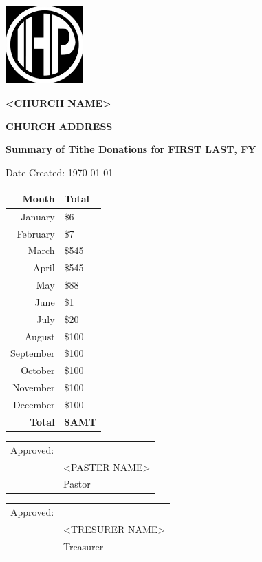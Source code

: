 \documentclass{article}
\newcommand{\mysubtitle}[1]{\large\textbf{#1}\par}
\newcommand{\mytitle}[1]{\LARGE \textbf{#1}\par}
\newcommand{\mydate}[1]{\small #1\par}
\begin{document}
\noindent
\begin{minipage}[t]{.3\textwidth}
\vspace{0pt}\includegraphics[width=3cm,height=3cm]{unnamed.jpg}
\end{minipage}%
\begin{minipage}[t]{.7\textwidth}
\vspace{0pt}
\mytitle{<CHURCH NAME>}
\mysubtitle{CHURCH ADDRESS}
\mysubtitle{Summary of Tithe Donations for \newline FIRST LAST, FY \the\year}
\mydate{Date Created: \today}
\end{minipage}

\bigskip
\bigskip

\begin{table}[h!]
\centering
\Large
\begin{tabular}{r l}
 Month & Total \\ [0.5ex]
 \hline\hline
 January & \$6  \\
 February & \$7  \\
 March & \$545 \\
 April & \$545 \\
 May & \$88  \\
 June & \$1 \\
 July & \$20 \\
 August & \$100 \\
 September & \$100 \\
 October & \$100 \\
 November & \$100 \\
 December & \$100 \\ [1ex]
 \hline \hline
 \textbf{Total} & \textbf{\$AMT}
\end{tabular}
\end{table}
\bigskip
\bigskip

\begin{tabular}{@{}p{.5in}p{4in}@{}}
Approved: & \hrulefill \\
& <PASTER NAME>\\
& Pastor \\
\end{tabular}
\bigskip
\bigskip

\begin{tabular}{@{}p{.5in}p{4in}@{}}
Approved: & \hrulefill \\
& <TRESURER NAME> \\
& Treasurer \\
\end{tabular}
\end{document}
